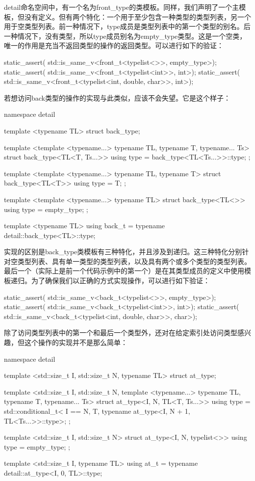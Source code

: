 detail命名空间中，有一个名为front_type的类模板。同样，我们声明了一个主模板，但没有定义。但有两个特化：一个用于至少包含一种类型的类型列表，另一个用于空类型列表。前一种情况下，type成员是类型列表中的第一个类型的别名。后一种情况下，没有类型，所以type成员别名为empty_type类型。这是一个空类，唯一的作用是充当不返回类型的操作的返回类型。可以进行如下的验证：

\begin{cppcode}
static_assert(
	std::is_same_v<front_t<typelist<>>, empty_type>);
static_assert(
	std::is_same_v<front_t<typelist<int>>, int>);
static_assert(
	std::is_same_v<front_t<typelist<int, double, char>>,
				   int>);
\end{cppcode}

若想访问back类型的操作的实现与此类似，应该不会失望。它是这个样子：

\begin{cppcode}
namespace detail
{
	template <typename TL>
	struct back_type;
	
	template <template <typename...> typename TL,
			  typename T, typename... Ts>
	struct back_type<TL<T, Ts...>>
	{
		using type = back_type<TL<Ts...>>::type;
	};

	template <template <typename...> typename TL,
	          typename T>
	struct back_type<TL<T>>
	{
		using type = T;
	};

	template <template <typename...> typename TL>
	struct back_type<TL<>>
	{
		using type = empty_type;
	};
}

template <typename TL>
using back_t = typename detail::back_type<TL>::type;
\end{cppcode}

实现的区别是back_type类模板有三种特化，并且涉及到递归。这三种特化分别针对空类型列表、具有单一类型的类型列表，以及具有两个或多个类型的类型列表。最后一个（实际上是前一个代码示例中的第一个）是在其类型成员的定义中使用模板递归。为了确保我们以正确的方式实现操作，可以进行如下验证：

\begin{cppcode}
static_assert(
	std::is_same_v<back_t<typelist<>>, empty_type>);
static_assert(
	std::is_same_v<back_t<typelist<int>>, int>);
static_assert(
	std::is_same_v<back_t<typelist<int, double, char>>,
				   char>);
\end{cppcode}

除了访问类型列表中的第一个和最后一个类型外，还对在给定索引处访问类型感兴趣，但这个操作的实现并不是那么简单：

\begin{cppcode}
namespace detail
{
	template <std::size_t I, std::size_t N, typename TL>
	struct at_type;
	
	template <std::size_t I, std::size_t N,
			  template <typename...> typename TL,
			  typename T, typename... Ts>
	struct at_type<I, N, TL<T, Ts...>>
	{
		using type =
		std::conditional_t<
		I == N,
		T,
		typename at_type<I, N + 1, TL<Ts...>>::type>;
	};

	template <std::size_t I, std::size_t N>
	struct at_type<I, N, typelist<>>
	{
		using type = empty_type;
	};
}

template <std::size_t I, typename TL>
using at_t = typename detail::at_type<I, 0, TL>::type;
\end{cppcode}

